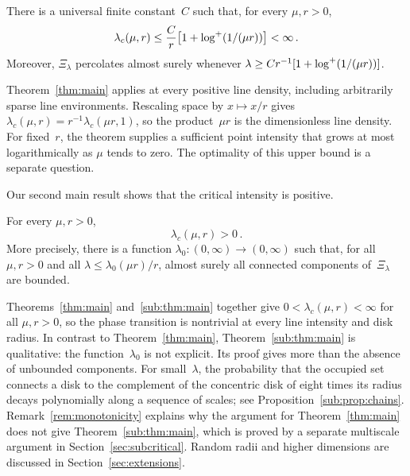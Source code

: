 \documentclass[11pt,letterpaper]{article}
\begin{document}
\begin{theorem}
\label{thm:main}
There is a universal finite constant~$C$ such that, for every $\mu,r>0$,
\begin{equation*}
  \lambda_c(\mu,r)\le\frac{C}{r}\bigl[1+\log^{+}(1/(\mu r))\bigr]<\infty\,.
\end{equation*}
Moreover, $\Xi_\lambda$ percolates almost surely whenever $\lambda\ge Cr^{-1}[1+\log^{+}(1/(\mu r))]$.
\end{theorem}

Theorem~\ref{thm:main} applies at every positive line density, including arbitrarily sparse line environments. Rescaling space by $x\mapsto x/r$ gives $\lambda_c(\mu,r)=r^{-1}\lambda_c(\mu r,1)$, so the product~$\mu r$ is the dimensionless line density. For fixed~$r$, the theorem supplies a sufficient point intensity that grows at most logarithmically as $\mu$ tends to zero. The optimality of this upper bound is a separate question.

Our second main result shows that the critical intensity is positive.

\begin{theorem}
\label{sub:thm:main}
For every $\mu,r>0$,
\begin{equation*}
  \lambda_c(\mu,r)>0\,.
\end{equation*}
More precisely, there is a function $\lambda_0\colon(0,\infty)\to(0,\infty)$ such that, for all $\mu,r>0$ and all $\lambda\le\lambda_0(\mu r)/r$, almost surely all connected components of~$\Xi_\lambda$ are bounded.
\end{theorem}

Theorems~\ref{thm:main} and~\ref{sub:thm:main} together give $0<\lambda_c(\mu,r)<\infty$ for all $\mu,r>0$, so the phase transition is nontrivial at every line intensity and disk radius. In contrast to Theorem~\ref{thm:main}, Theorem~\ref{sub:thm:main} is qualitative: the function~$\lambda_0$ is not explicit. Its proof gives more than the absence of unbounded components. For small~$\lambda$, the probability that the occupied set connects a disk to the complement of the concentric disk of eight times its radius decays polynomially along a sequence of scales; see Proposition~\ref{sub:prop:chains}. Remark~\ref{rem:monotonicity} explains why the argument for Theorem~\ref{thm:main} does not give Theorem~\ref{sub:thm:main}, which is proved by a separate multiscale argument in Section~\ref{sec:subcritical}. Random radii and higher dimensions are discussed in Section~\ref{sec:extensions}.
\end{document}
